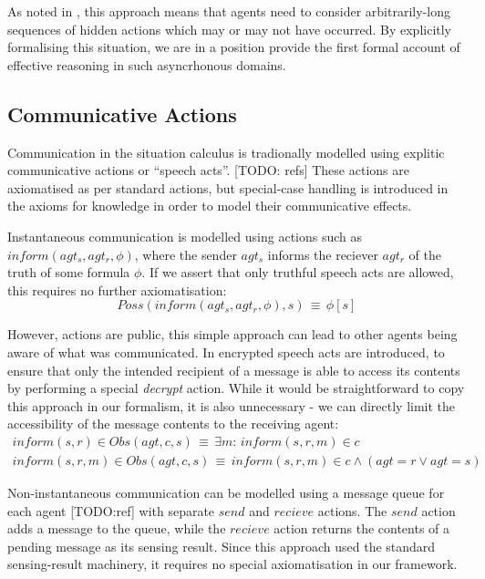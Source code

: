 As noted in \citep{Lesperance99sitcalc_approach}, this approach means
that agents need to consider arbitrarily-long sequences of hidden
actions which may or may not have occurred. By explicitly formalising
this situation, we are in a position provide the first formal account
of effective reasoning in such asyncrhonous domains.


\subsection{Communicative Actions}

Communication in the situation calculus is tradionally modelled using
explitic communicative actions or {}``speech acts''. {[}TODO: refs]
These actions are axiomatised as per standard actions, but special-case
handling is introduced in the axioms for knowledge in order to model
their communicative effects.

Instantaneous communication is modelled using actions such as $inform(agt_{s},agt_{r},\phi)$,
where the sender $agt_{s}$ informs the reciever $agt_{r}$ of the
truth of some formula $\phi$. If we assert that only truthful speech
acts are allowed, this requires no further axiomatisation:\[
Poss(inform(agt_{s},agt_{r},\phi),s)\,\equiv\,\phi[s]\]


However, actions are public, this simple approach can lead to other
agents being aware of what was communicated. In \citep{shapiro01casl_feat_inter}
encrypted speech acts are introduced, to ensure that only the intended
recipient of a message is able to access its contents by performing
a special \emph{decrypt }action. While it would be straightforward
to copy this approach in our formalism, it is also unnecessary - we
can directly limit the accessibility of the message contents to the
receiving agent:\begin{gather*}
inform(s,r)\in Obs(agt,c,s)\,\equiv\,\exists m:\, inform(s,r,m)\in c\\
inform(s,r,m)\in Obs(agt,c,s)\,\equiv\, inform(s,r,m)\in c\wedge\left(agt=r\vee agt=s\right)\end{gather*}


Non-instantaneous communication can be modelled using a message queue
for each agent {[}TODO:ref] with separate $send$ and $recieve$ actions.
The $send$ action adds a message to the queue, while the $recieve$
action returns the contents of a pending message as its sensing result.
Since this approach used the standard sensing-result machinery, it
requires no special axiomatisation in our framework.


